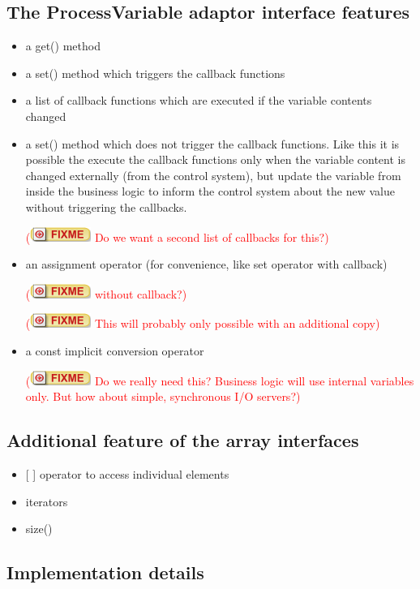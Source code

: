\documentclass[11pt,a4paper]{scrartcl}
\newcounter{nFixmes}
\newcommand{\fixme}[1]{\addtocounter{nFixmes}{1}\textcolor{red}{(\includegraphics[height=2ex]{fixme} #1)}\xspace}
\begin{document}
\subsection{The ProcessVariable adaptor interface features}
\begin{itemize}
\item a get() method
\item a set() method which triggers the callback functions
\item a list of callback functions which are executed if the variable contents changed
\item a set() method which does not trigger the callback functions. Like this it is possible the execute the callback functions only when the variable content is changed externally (from the control system), but update the variable from inside the business logic to inform the control system about the new value without triggering the callbacks.
  \fixme{Do we want a second list of callbacks for this?}
\item an assignment operator (for convenience, like set operator with callback) \fixme{without callback?} \fixme{This will probably only possible with an additional copy}
\item a const implicit conversion operator \fixme{Do we really need this? Business logic will use internal variables only. But how about simple, synchronous I/O servers?}
\end{itemize}

\subsection{Additional feature of the array interfaces}

\begin{itemize}
\item {[ ]} operator to access individual elements
\item iterators
\item size()
\end{itemize}

\subsection{Implementation details}
\end{document}
